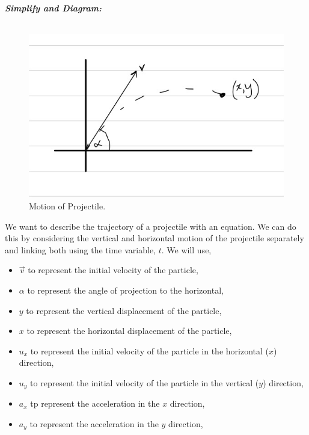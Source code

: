 \begin{subquestions}
\textbf{\textit{Simplify and Diagram:}} \\ \\
\begin{figure}[H]
	\begin{center}
		\includegraphics[scale=0.25]{../2013/figures/2013q6-3}
		\caption{\label{2013:q6:Diagram3} Motion of Projectile.}
	\end{center}
\end{figure}
We want to describe the trajectory of a projectile with an equation. We can do this by considering the vertical and horizontal motion of the projectile separately and linking both using the time variable, $t$. We will use,
\begin{itemize}
	\item $\vec{v}$ to represent the initial velocity of the particle,
	\item $\alpha$ to represent the angle of projection to the horizontal,
	\item $y$ to represent the vertical displacement of the particle,
	\item $x$ to represent the horizontal displacement of the particle,
	\item $u_x$ to represent the initial velocity of the particle in the horizontal ($x$) direction,
	\item $u_y$ to represent the initial velocity of the particle in the vertical ($y$) direction,
	\item $a_x$ tp represent the acceleration in the $x$ direction,
	\item $a_y$ to represent the acceleration in the $y$ direction,
\end{itemize}  





\end{subquestions}
